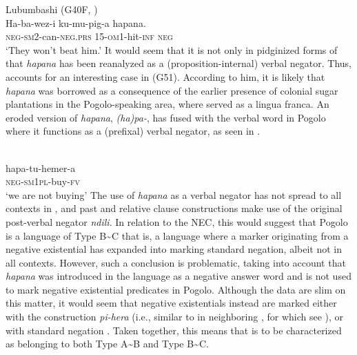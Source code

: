 \documentclass[output=paper,draft,draftmode,colorlinks,citecolor=brown]{langscibook}
\begin{document}
\ea\label{ex:lubumbashi-beat}
Lubumbashi  (G40F, \citealt[84]{Schicho1992})\\
\gll Ha-ba-wez-i ku-mu-pig-a hapana.\\
	\textsc{neg}-\textsc{sm}2-can-\textsc{neg.prs} 15-\textsc{om}1-hit-\textsc{inf} \textsc{neg}\\
\glt 	`They won't beat him.'
\z
%
It would seem that it is not only in pidginized forms of  that
\textit{hapana} has been reanalyzed as a (proposition-internal) verbal
negator. Thus, \citet{Nurse2007} accounts for an interesting case in
 (G51). According to him, it is likely that \textit{hapana} was
borrowed as a consequence of the earlier presence of colonial sugar
plantations in the Pogolo-speaking area, where  served as a lingua
franca. An eroded version of \textit{hapana}, \textit{(ha)pa-}, has fused
with the verbal word in Pogolo where it functions as a (prefixal) verbal
negator, as seen in .
%

\ea\label{ex:pogolo-buy}
\\
\gll hapa-tu-hemer-a\\
	\textsc{neg-sm1pl}-buy-\textsc{fv}\\
\glt 	`we are not buying'
\z
%
The use of \textit{hapana} as a verbal negator has not spread to all
contexts in , and past and relative clause constructions make use of the original post-verbal negator \textit{ndili}. In relation to the NEC, this would suggest that Pogolo is a language of Type B{\textasciitilde}C \textendash that is, a language where a marker originating from a negative existential has expanded into marking standard negation, albeit not in all contexts. However, such a conclusion is problematic, taking into account that \textit{hapana} was introduced in the language as a negative answer word and is not used to mark negative existential predicates in Pogolo. Although the data are slim on this matter, it would seem that negative existentials instead are marked either with the construction \textit{pi-hera} (i.e., similar to in neighboring , for which see ), or with standard negation \citep{Hendle1907}. Taken together, this means that  is to be characterized as belonging to both Type A{\textasciitilde}B and Type B{\textasciitilde}C.
\end{document}
